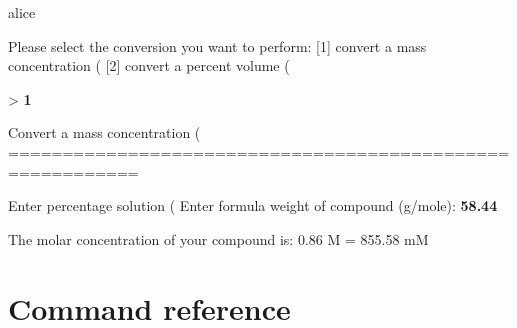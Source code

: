 \documentclass[11pt,a4paper,oneside]{report}
\newcommand{\inp}[1]{\textbf{\textcolor{pmblue}{#1}}}
\begin{document}
\begin{session}
alice%

Please select the conversion you want to perform:
 [1] convert a mass concentration (%
 [2] convert a percent volume (%

> \inp{1}

Convert a mass concentration (%
==========================================================

Enter percentage solution (%
Enter formula weight of compound (g/mole): \inp{58.44}

The molar concentration of your compound is: 0.86 M = 855.58 mM
\end{session}

\section{Command reference}
\end{document}
